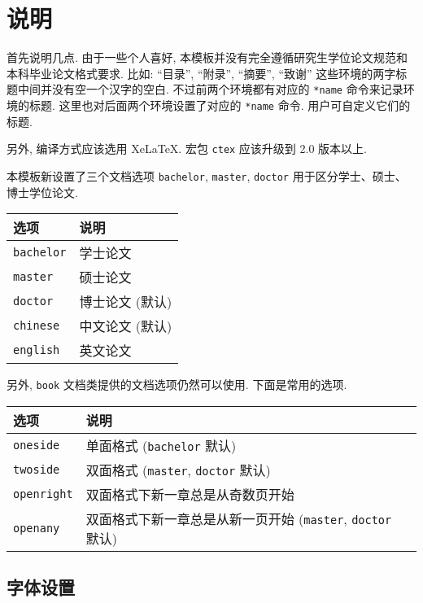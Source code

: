 ﻿\chapter{说明}

首先说明几点. 由于一些个人喜好, 本模板并没有完全遵循研究生学位论文规范和本科毕业论文格式要求. 比如: ``目录'', ``附录'', ``摘要'', ``致谢'' 这些环境的两字标题中间并没有空一个汉字的空白. 不过前两个环境都有对应的 \verb|*name| 命令来记录环境的标题. 这里也对后面两个环境设置了对应的 \verb|*name| 命令. 用户可自定义它们的标题.

另外, 编译方式应该选用 XeLaTeX. 宏包 \verb|ctex| 应该升级到 2.0 版本以上.

本模板新设置了三个文档选项 \verb|bachelor|, \verb|master|, \verb|doctor| 用于区分学士、硕士、博士学位论文.

\begin{center}
  \begin{tabular}{ll}
    \toprule
    选项        & 说明\\
    \midrule
    \verb|bachelor|  & 学士论文\\
    \verb|master|    & 硕士论文\\
    \verb|doctor|    & 博士论文 (默认)\\
    \verb|chinese|   & 中文论文 (默认)\\
    \verb|english|   & 英文论文\\
    \bottomrule
  \end{tabular}
\end{center}

另外, \verb|book| 文档类提供的文档选项仍然可以使用. 下面是常用的选项.

\begin{center}
  \begin{tabular}{lp{}l}
    \toprule
    选项        & 说明\\
    \midrule
    \verb|oneside|   & 单面格式 (\verb|bachelor| 默认)\\
    \verb|twoside|   & 双面格式 (\verb|master|, \verb|doctor| 默认)\\
    \midrule
    \verb|openright| & 双面格式下新一章总是从奇数页开始\\
    \verb|openany|   & 双面格式下新一章总是从新一页开始
                       (\verb|master|, \verb|doctor| 默认)\\
    \bottomrule
  \end{tabular}
\end{center}

\section{字体设置}

